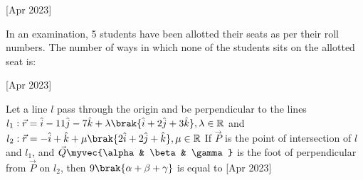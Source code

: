 	\hfill [Apr 2023]
	
	\item
	In an examination, 5 students have been allotted their seats as per their roll numbers. The number of ways in which none of the students sits on the allotted seat is:
	
	\hfill [Apr 2023]
	
	\item
Let a line $l$ pass through the origin and be perpendicular to the lines \\
	$l_1 : \vec{r} = \hat{i} - 11\hat{j} - 7\hat{k} + \lambda\brak{\hat{i} +2\hat{j} + 3\hat{k}}, \lambda \in \mathbb{R}$ and \\
	$l_2 : \vec{r} = -\hat{i} + \hat{k} + \mu\brak{2\hat{i} +2\hat{j} + \hat{k}}, \mu \in \mathbb{R}$
	If $\vec{P}$ is the point of intersection of $l$ and $l_1$, and $\vec{Q} \myvec{\alpha & \beta & \gamma}$ is the foot of perpendicular from $\vec{P}$ on $l_2$, then $9\brak{\alpha+\beta+\gamma}$ is equal to
	\hfill [Apr 2023]

